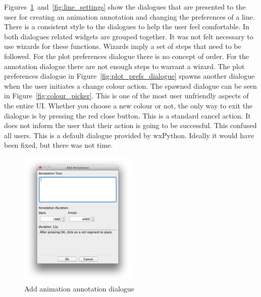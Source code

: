 Figures~\ref{fig:add_anime_annotation}~and~\ref{fig:line_settings} show the dialogues that are presented to the user for creating an animation annotation and changing the preferences of a line.  There is a consistent style to the dialogues to help the user feel comfortable.  In both dialogues related widgets are grouped together.  It was not felt necessary to use wizards for these functions.  Wizards imply a set of steps that need to be followed.  For the plot preferences dialogue there is no concept of order.  For the annotation dialogue there are not enough steps to warrant a wizard.  The plot preferences dialogue in Figure~\ref{fig:plot_prefs_dialogue} spawns another dialogue when the user initiates a change colour action.  The spawned dialogue can be seen in Figure~\ref{fig:colour_picker}.  This is one of the most user unfriendly aspects of the entire \ac{UI}.  Whether you choose a new colour or not, the only way to exit the dialogue is by pressing the red close button.  This is a standard cancel action.  It does not inform the user that their action is going to be successful.  This confused all users.  This is a default dialogue provided by wxPython.  Ideally it would have been fixed, but there was not time.

\begin{figure}[h!]
    \centering
    \includegraphics[width=0.5\textwidth]{images/add_annotation_dialogue.png}
    \caption{Add animation annotation dialogue}
    \label{fig:add_anime_annotation}
\end{figure}

